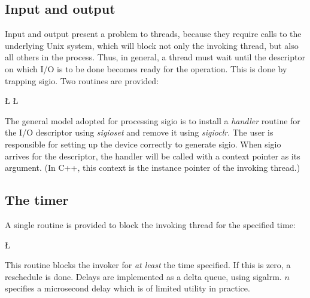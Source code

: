 \subsection{Input and output}
Input and output present a problem to threads, because they require
calls to the underlying {\sc Unix} system, which will block not only
the invoking thread, but also all others in the process.  Thus, in
general, a thread must wait until the descriptor on which I/O is to
be done becomes ready for the operation.  This is done by trapping
{\sc sigio}.  Two routines are provided:
\begin{tgrind}
\L{\LB{}}
\L{\LB{}}
\end{tgrind}
The general model adopted for processing {\sc sigio} is to install a
{\em handler} routine for the I/O descriptor using {\em sigioset} and
remove it using {\em sigioclr}.  The user is responsible for setting up
the device correctly to generate {\sc sigio}.  When {\sc sigio} arrives
for the descriptor, the handler will be called with a context pointer
as its argument.  (In C++, this context is the instance pointer of the
invoking thread.)

\subsection{The timer}
A single routine is provided to block the invoking thread for the
specified time:
\begin{tgrind}
\L{\LB{}}
\end{tgrind}
This routine blocks the invoker for {\em at least\/} the time specified.
If this is zero, a reschedule is done.  Delays are implemented as a
delta queue, using {\sc sigalrm}.  $n$ specifies a microsecond delay
which is of limited utility in practice.

